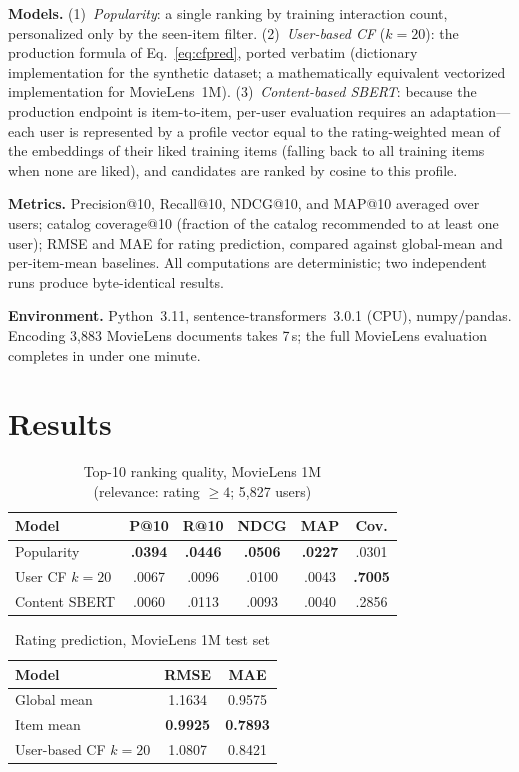 \documentclass[conference]{IEEEtran}
\begin{document}
\textbf{Models.} (1)~\emph{Popularity}: a single ranking by training
interaction count, personalized only by the seen-item filter.
(2)~\emph{User-based CF} ($k=20$): the production formula of
Eq.~\eqref{eq:cfpred}, ported verbatim (dictionary implementation for the
synthetic dataset; a mathematically equivalent vectorized implementation for
MovieLens~1M). (3)~\emph{Content-based SBERT}: because the production endpoint
is item-to-item, per-user evaluation requires an adaptation---each user is
represented by a profile vector equal to the rating-weighted mean of the
embeddings of their liked training items (falling back to all training items
when none are liked), and candidates are ranked by cosine to this profile.

\textbf{Metrics.} Precision@10, Recall@10, NDCG@10, and MAP@10 averaged over
users; catalog coverage@10 (fraction of the catalog recommended to at least one
user); RMSE and MAE for rating prediction, compared against global-mean and
per-item-mean baselines. All computations are deterministic; two independent
runs produce byte-identical results.

\textbf{Environment.} Python~3.11, sentence-transformers~3.0.1 (CPU),
numpy/pandas. Encoding 3{,}883 MovieLens documents takes 7\,s; the full
MovieLens evaluation completes in under one minute.

\section{Results}\label{sec:results}

\begin{table}[t]
\caption{Top-10 ranking quality, MovieLens 1M\\(relevance: rating $\ge 4$; 5{,}827 users)}
\label{tab:ml_ranking}
\centering
\begin{tabular}{lccccc}
\toprule
Model & P@10 & R@10 & NDCG & MAP & Cov. \\
\midrule
Popularity & \textbf{.0394} & \textbf{.0446} & \textbf{.0506} & \textbf{.0227} & .0301 \\
User CF $k{=}20$ & .0067 & .0096 & .0100 & .0043 & \textbf{.7005} \\
Content SBERT & .0060 & .0113 & .0093 & .0040 & .2856 \\
\bottomrule
\end{tabular}
\end{table}

\begin{table}[t]
\caption{Rating prediction, MovieLens 1M test set}
\label{tab:ml_rating}
\centering
\begin{tabular}{lcc}
\toprule
Model & RMSE & MAE \\
\midrule
Global mean & 1.1634 & 0.9575 \\
Item mean & \textbf{0.9925} & \textbf{0.7893} \\
User-based CF $k{=}20$ & 1.0807 & 0.8421 \\
\bottomrule
\end{tabular}
\end{table}
\end{document}
